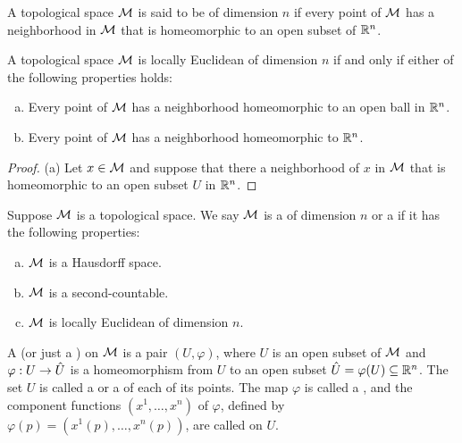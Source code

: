 \documentclass[11pt,a4paper]{article}
\begin{document}
\begin{definition}
A topological space $\mathcal{M}$ is said to be  of dimension $n$ if every point of $\mathcal{M}$ has a neighborhood in $\mathcal{M}$ that is homeomorphic to an open subset of $\mathbb{R}^n$.
\end{definition}

\begin{lemma}
A topological space $\mathcal{M}$ is locally Euclidean of dimension $n$ if and only if either of the following properties holds:
\begin{enumerate}[(a)]
    \item Every point of $\mathcal{M}$ has a neighborhood homeomorphic to an open ball in $\mathbb{R}^n$.
    \item Every point of $\mathcal{M}$ has a neighborhood homeomorphic to $\mathbb{R}^n$.
\end{enumerate}
\end{lemma}

\begin{proof}
(a) \forward Let $x\in \mathcal{M}$ and suppose that there a neighborhood of $x$ in $\mathcal{M}$ that is homeomorphic to an open subset $U$ in $\mathbb{R}^n$. 

\end{proof}

\begin{definition}
Suppose $\mathcal{M}$ is a topological space. We say $\mathcal{M}$ is a  of dimension $n$ or a  if it has the following properties:
\begin{enumerate}[(a)]
    \item $\mathcal{M}$ is a {Hausdorff space}.
    \item $\mathcal{M}$ is a {second-countable}.
    \item $\mathcal{M}$ is {locally Euclidean of dimension $n$}.
\end{enumerate}
A  (or just a ) on $\mathcal{M}$ is a pair $(U,\varphi)$, where $U$ is an open subset of $\mathcal{M}$ and $\varphi:U\rightarrow \hat{U}$ is a homeomorphism from $U$ to an open subset $\hat{U} = \varphi(U)\subseteq \mathbb{R}^n$. The set $U$ is called a  or a  of each of its points. The map $\varphi$ is called a , and the component functions $(x^1,\ldots,x^n)$ of $\varphi$, defined by $\varphi(p) = (x^1(p),\ldots,x^n(p))$, are called  on $U$.
\end{definition}
\end{document}
